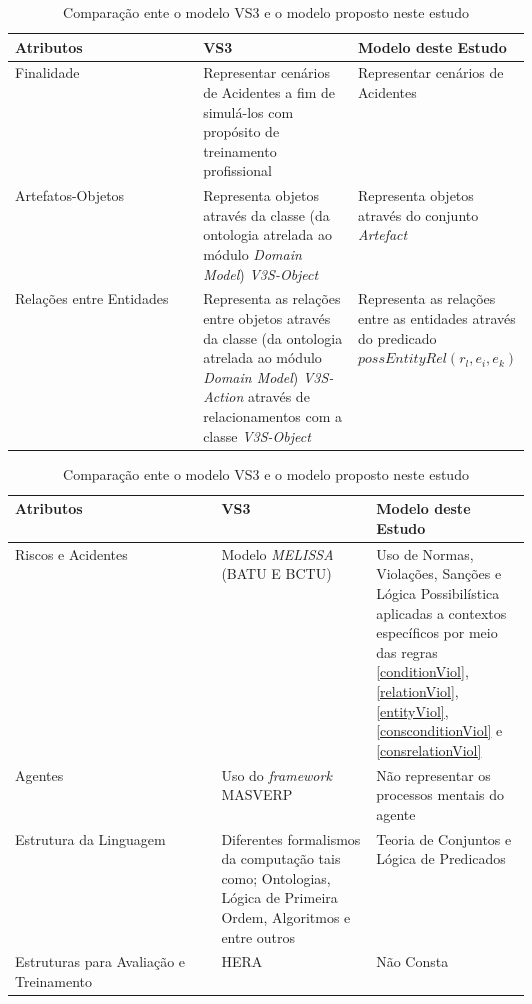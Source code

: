 \begin{table}[H]
\centering
\begin{tabular}{|l|p{0.3\linewidth}|p{0.3\linewidth}|}
\hline			
\textbf{Atributos}
& 
\textbf{VS3}
& 
\textbf{Modelo deste Estudo} 
\\ \hline
Finalidade
&
Representar cenários de Acidentes a fim de simulá-los com propósito de treinamento profissional 
&
Representar cenários de Acidentes 
\\ \hline
Artefatos-Objetos
&
Representa objetos através da classe (da ontologia atrelada ao módulo \textit{Domain Model}) \textit{V3S-Object}
&
Representa objetos através do conjunto \textit{Artefact}
\\ \hline
Relações entre Entidades
&
Representa as relações entre objetos através da classe (da ontologia atrelada ao módulo \textit{Domain Model}) \textit{V3S-Action} através de relacionamentos com a classe \textit{V3S-Object}
&
Representa as relações entre as entidades através do predicado $possEntityRel(r_l,e_i,e_k)$
\\ \hline
\end{tabular}
\caption{Comparação ente o modelo VS3 e o modelo proposto neste estudo}
\label{vs3comparacao1}
\end{table}


\begin{table}[H]
\centering
\begin{tabular}{|l|p{0.3\linewidth}|p{0.3\linewidth}|}
\hline			
\textbf{Atributos}
& 
\textbf{VS3}
& 
\textbf{Modelo deste Estudo} 
\\ \hline
Riscos e Acidentes
&
Modelo \textit{MELISSA} (BATU E BCTU)
&
Uso de Normas, Violações, Sanções e Lógica Possibilística aplicadas a contextos específicos por meio das regras \ref{conditionViol}, \ref{relationViol}, \ref{entityViol}, \ref{consconditionViol} e \ref{consrelationViol}
\\ \hline 
Agentes     	
& 
Uso do \textit{framework} MASVERP 
& 
Não representar os processos mentais do agente 
\\ \hline 
Estrutura da Linguagem
& 
Diferentes formalismos da computação tais como; Ontologias, Lógica de Primeira Ordem, Algoritmos e entre outros
&
Teoria de Conjuntos e Lógica de Predicados
\\ \hline 
Estruturas para Avaliação e Treinamento
& 
HERA
&
Não Consta
\\ \hline
\end{tabular}
\caption{Comparação ente o modelo VS3 e o modelo proposto neste estudo}
\label{vs3comparacao2}
\end{table}

